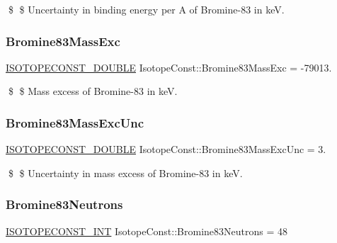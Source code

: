 \$ \$ Uncertainty in binding energy per A of Bromine-\/83 in keV. \mbox{\label{group___isotope_const-_bromine-_br83_ga09536a87b05b413eee0c54867eb993c6}} 
\subsubsection{\texorpdfstring{Bromine83\+Mass\+Exc}{Bromine83MassExc}}
{\footnotesize\ttfamily \mbox{\hyperlink{group___isotope_const-_macros_ga8f45a7272ce02c0b4c65c44636ed719a}{I\+S\+O\+T\+O\+P\+E\+C\+O\+N\+S\+T\+\_\+\+D\+O\+U\+B\+LE}} Isotope\+Const\+::\+Bromine83\+Mass\+Exc = -\/79013.}

\$ \$ Mass excess of Bromine-\/83 in keV. \mbox{\label{group___isotope_const-_bromine-_br83_ga1ddc9acbdd5b029827d47a6959651d8b}} 
\subsubsection{\texorpdfstring{Bromine83\+Mass\+Exc\+Unc}{Bromine83MassExcUnc}}
{\footnotesize\ttfamily \mbox{\hyperlink{group___isotope_const-_macros_ga8f45a7272ce02c0b4c65c44636ed719a}{I\+S\+O\+T\+O\+P\+E\+C\+O\+N\+S\+T\+\_\+\+D\+O\+U\+B\+LE}} Isotope\+Const\+::\+Bromine83\+Mass\+Exc\+Unc = 3.}

\$ \$ Uncertainty in mass excess of Bromine-\/83 in keV. \mbox{\label{group___isotope_const-_bromine-_br83_gadbc07d10734614c741f28cabcf673634}} 
\subsubsection{\texorpdfstring{Bromine83\+Neutrons}{Bromine83Neutrons}}
{\footnotesize\ttfamily \mbox{\hyperlink{group___isotope_const-_macros_ga5f18360b3e99483a35c32d789e62621c}{I\+S\+O\+T\+O\+P\+E\+C\+O\+N\+S\+T\+\_\+\+I\+NT}} Isotope\+Const\+::\+Bromine83\+Neutrons = 48}

